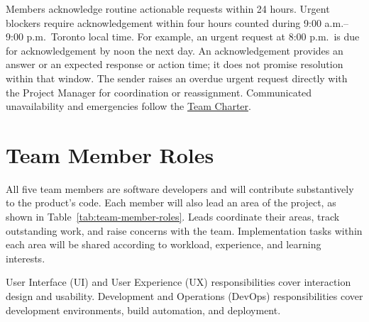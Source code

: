 \documentclass{article}
\begin{document}
Members acknowledge routine actionable requests within 24 hours.
Urgent blockers require acknowledgement within four hours counted
during 9:00 a.m.--9:00 p.m.\ Toronto local time. For example, an
urgent request at 8:00 p.m.\ is due for acknowledgement by noon
the next day. An acknowledgement provides an answer or an expected
response or action time; it does not promise resolution within
that window. The sender raises an overdue urgent request directly
with the Project Manager for coordination or reassignment.
Communicated unavailability and emergencies follow the
\hyperlink{app:team-charter}{Team Charter}.

\section{Team Member Roles}

\label{sec:team-member-roles}

All five team members are software developers and will contribute
substantively to the product's code. Each member will also lead an area
of the project, as shown in Table~\ref{tab:team-member-roles}. Leads
coordinate their areas, track outstanding work, and raise concerns with
the team. Implementation tasks within each area will be shared according
to workload, experience, and learning interests.

User Interface (UI) and User Experience (UX) responsibilities cover
interaction design and usability. Development and Operations (DevOps)
responsibilities cover development environments, build automation, and
deployment.
\end{document}
